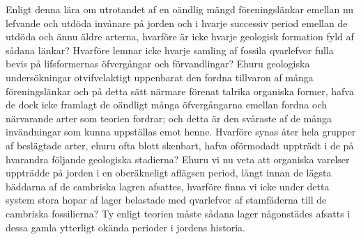 Enligt denna lära om utrotandet af en oändlig mängd föreningslänkar emellan nu lefvande och utdöda invånare på jorden och i hvarje successiv period emellan de utdöda och ännu äldre arterna, hvarföre är icke hvarje geologisk formation fyld af sådana länkar? Hvarföre lemnar icke hvarje samling af fossila qvarlefvor fulla bevis på lifsformernas öfvergångar och förvandlingar? Ehuru geologiska undersökningar otvifvelaktigt uppenbarat den fordna tillvaron af många föreningslänkar och på detta sätt närmare förenat talrika organiska former, hafva de dock icke framlagt de oändligt många öfvergångarna emellan fordna och närvarande arter som teorien fordrar; och detta är den svåraste af de många invändningar som kunna uppställas emot henne. Hvarföre synas åter hela grupper af beslägtade arter, ehuru ofta blott skenbart, hafva oförmodadt uppträdt i de på hvarandra följande geologiska stadierna? Ehuru vi nu veta att organiska varelser uppträdde på jorden i en oberäkneligt aflägsen period, långt innan de lägsta bäddarna af de cambriska lagren afsattes, hvarföre finna vi icke under detta system stora hopar af lager belastade med qvarlefvor af stamfäderna till de cambriska fossilierna? Ty enligt teorien måste sådana lager någonstädes afsatts i dessa gamla ytterligt okända perioder i jordens historia.

